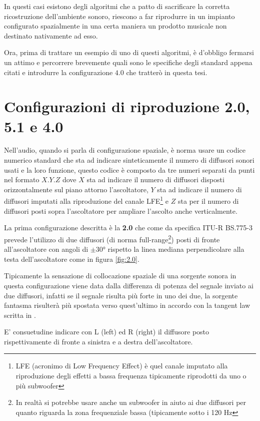 \documentclass[12pt,a4paper]{report}
\begin{document}
In questi casi esistono degli algoritmi che a patto di sacrificare la corretta ricostruzione dell'ambiente sonoro, riescono a far riprodurre in un impianto configurato spazialmente in una certa maniera un prodotto musicale non destinato nativamente ad esso.

Ora, prima di trattare un esempio di uno di questi algoritmi, è d'obbligo fermarsi un attimo e percorrere brevemente quali sono le specifiche degli standard appena citati e introdurre la configurazione $4.0$ che tratterò in questa tesi.

\section{Configurazioni di riproduzione 2.0, 5.1 e 4.0}\label{metodi}

Nell'audio, quando si parla di configurazione spaziale, è norma usare un codice numerico standard che sta ad indicare sinteticamente il numero di diffusori sonori usati e la loro funzione, questo codice è composto da tre numeri separati da punti nel formato $X.Y.Z$ dove $X$ sta ad indicare il numero di diffusori disposti orizzontalmente sul piano attorno l'ascoltatore, $Y$ sta ad indicare il numero di diffusori imputati alla riproduzione del canale LFE\footnote{LFE (acronimo di Low Frequency Effect) è quel canale imputato alla riproduzione degli effetti a bassa frequenza tipicamente riprodotti da uno o più subwoofer} e $Z$ sta per il numero di diffusori posti sopra l'ascoltatore per ampliare l'ascolto anche verticalmente.

La prima configurazione descritta è la \textbf{2.0} che come da specifica ITU-R BS.775-3\cite{5.1} prevede l'utilizzo di due diffusori (di norma full-range\footnote{In realtà si potrebbe usare anche un subwoofer in aiuto ai due diffusori per quanto riguarda la zona frequenziale bassa (tipicamente sotto i 120 Hz}) posti di fronte all'ascoltatore con angoli di $\pm 30°$ rispetto la linea mediana perpendicolare alla testa dell'ascoltatore come in figura \ref{fig:2.0}.

Tipicamente la sensazione di collocazione spaziale di una sorgente sonora in questa configurazione viene data dalla differenza di potenza del segnale inviato ai due diffusori, infatti se il segnale risulta più forte in uno dei due, la sorgente fantasma risulterà più spostata verso quest'ultimo in accordo con la tangent law scritta in \cite{vbap}.

E' consuetudine indicare con L (left) ed R (right) il diffusore posto rispettivamente di fronte a sinistra e a destra dell'ascoltatore.
\end{document}
